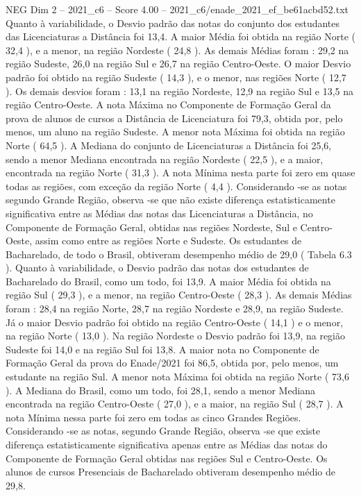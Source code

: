 \begin{textsample}{NEG Dim 2 – 2021\_c6 – Score 4.00 – 2021\_c6/enade\_2021\_ef\_be61acbd52.txt}
Quanto à variabilidade, o Desvio padrão das notas do conjunto dos estudantes das Licenciaturas a Distância foi 13,4.
A maior Média foi obtida na região Norte ( 32,4 ), e a menor, na região Nordeste ( 24,8 ).
As demais Médias foram : 29,2 na região Sudeste, 26,0 na região Sul e 26,7 na região Centro-Oeste.
O maior Desvio padrão foi obtido na região Sudeste ( 14,3 ), e o menor, nas regiões Norte ( 12,7 ).
Os demais desvios foram : 13,1 na região Nordeste, 12,9 na região Sul e 13,5 na região Centro-Oeste.
A nota Máxima no Componente de Formação Geral da prova de alunos de cursos a Distância de Licenciatura foi 79,3, obtida por, pelo menos, um aluno na região Sudeste.
A menor nota Máxima foi obtida na região Norte ( 64,5 ).
A Mediana do conjunto de Licenciaturas a Distância foi 25,6, sendo a menor Mediana encontrada na região Nordeste ( 22,5 ), e a maior, encontrada na região Norte ( 31,3 ).
A nota Mínima nesta parte foi zero em quase todas as regiões, com exceção da região Norte ( 4,4 ).
Considerando -se as notas segundo Grande Região, observa -se que não existe diferença estatisticamente significativa entre as Médias das notas das Licenciaturas a Distância, no Componente de Formação Geral, obtidas nas regiões Nordeste, Sul e Centro-Oeste, assim como entre as regiões Norte e Sudeste.
Os estudantes de Bacharelado, de todo o Brasil, obtiveram desempenho médio de 29,0 ( Tabela 6.3 ).
Quanto à variabilidade, o Desvio padrão das notas dos estudantes de Bacharelado do Brasil, como um todo, foi 13,9.
A maior Média foi obtida na região Sul ( 29,3 ), e a menor, na região Centro-Oeste ( 28,3 ).
As demais Médias foram : 28,4 na região Norte, 28,7 na região Nordeste e 28,9, na região Sudeste.
Já o maior Desvio padrão foi obtido na região Centro-Oeste ( 14,1 ) e o menor, na região Norte ( 13,0 ).
Na região Nordeste o Desvio padrão foi 13,9, na região Sudeste foi 14,0 e na região Sul foi 13,8.
A maior nota no Componente de Formação Geral da prova do Enade/2021 foi 86,5, obtida por, pelo menos, um estudante na região Sul.
A menor nota Máxima foi obtida na região Norte ( 73,6 ).
A Mediana do Brasil, como um todo, foi 28,1, sendo a menor Mediana encontrada na região Centro-Oeste ( 27,0 ), e a maior, na região Sul ( 28,7 ).
A nota Mínima nessa parte foi zero em todas as cinco Grandes Regiões.
Considerando -se as notas, segundo Grande Região, observa -se que existe diferença estatisticamente significativa apenas entre as Médias das notas do Componente de Formação Geral obtidas nas regiões Sul e Centro-Oeste.
Os alunos de cursos Presenciais de Bacharelado obtiveram desempenho médio de 29,8.

\end{textsample}
